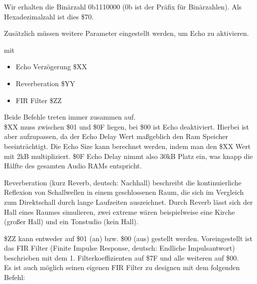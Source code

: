 Wir erhalten die Binärzahl 0b1110000 (0b ist der Präfix für Binärzahlen). Als Hexadezimalzahl ist dies \$70.

\bigskip

Zusätzlich müssen weitere Parameter eingestellt werden, um Echo zu aktivieren.

\medskip



\medskip

mit

\begin{itemize}
	\item Echo Verzögerung \$XX
	\item Reverberation \$YY
	\item FIR Filter \$ZZ
\end{itemize}

Beide Befehle treten immer zusammen auf. \\

\$XX muss zwischen \$01 und \$0F liegen, bei \$00 ist Echo deaktiviert. Hierbei ist aber aufzupassen, da der Echo Delay Wert maßgeblich den Ram Speicher beeinträchtigt. Die Echo Size kann berechnet werden, indem man den \$XX Wert mit 2kB multipliziert. \$0F Echo Delay nimmt also 30kB Platz ein, was knapp die Hälfte des gesamten Audio RAMs entspricht.

\bigskip

Reverberation (kurz Reverb, deutsch: Nachhall) beschreibt die kontinuierliche Reflexion von Schallwellen in einem geschlossenen Raum, die sich im Vergleich zum Direktschall durch lange Laufzeiten auszeichnet. Durch Reverb lässt sich der Hall eines Raumes simulieren, zwei extreme wären beispielweise eine Kirche (großer Hall) und ein Tonstudio (kein Hall).

\bigskip

\$ZZ kann entweder auf \$01 (an) bzw. \$00 (aus) gestellt werden. Voreingestellt ist das FIR Filter (Finite Impulse Response, deutsch: Endliche Impulsantwort) beschrieben mit dem 1. Filterkoeffizienten auf \$7F und alle weiteren auf \$00. \\
Es ist auch möglich seinen eigenen FIR Filter zu designen mit dem folgenden Befehl:

\medskip




